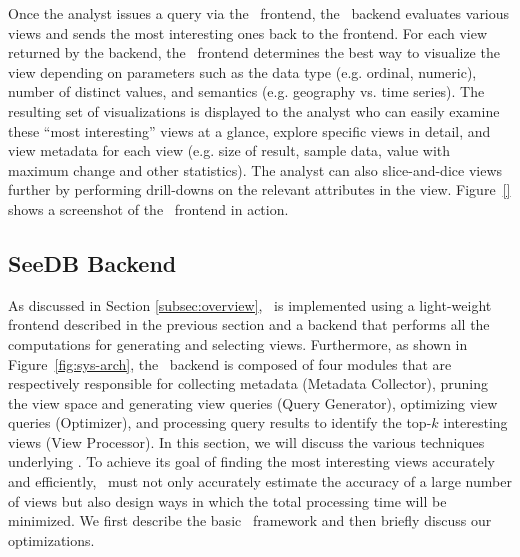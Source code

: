 Once the analyst issues a query via the \SeeDB\ frontend, the \SeeDB\ backend
evaluates various views and sends the most interesting ones back to the
frontend.
For each view returned by the backend, the \SeeDB\ frontend determines the best
way to visualize the view depending on parameters such as the data
type (e.g. ordinal, numeric), number of distinct values, and semantics (e.g.
geography vs.
time series).
The resulting set of visualizations is displayed to the analyst who can easily
examine these ``most interesting'' views at a glance, explore specific views in
detail, and view metadata for each view (e.g. size of result, sample data, value with
maximum change and other statistics). 
The analyst can also slice-and-dice views further by performing drill-downs on
the relevant attributes in the view. 
Figure~\ref{} shows a screenshot of the \SeeDB\ frontend in action.

\subsection{SeeDB Backend}
\label{subsec:seedb_backend}

As discussed in Section \ref{subsec:overview}, \SeeDB\ is implemented using a
light-weight frontend described in the previous section and a backend that
performs all the computations for generating and selecting views. Furthermore,
as shown in Figure~\ref{fig:sys-arch}, the \SeeDB\ backend is composed of four
modules that are respectively responsible for collecting metadata (Metadata Collector), pruning
the view space and generating view queries (Query Generator), optimizing view
queries (Optimizer), and processing query results to identify the top-$k$
interesting views (View Processor). In this section, we will discuss the various
techniques underlying \SeeDB. To achieve its goal of finding the most
interesting views accurately and efficiently, \SeeDB\ must not only accurately
estimate the accuracy of a large number of views but also design ways in which
the total processing time will be minimized.
We first describe the basic \SeeDB\ framework and then briefly discuss our optimizations.


